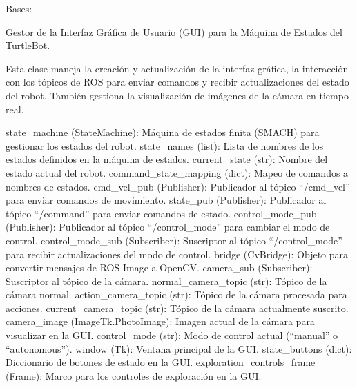 \documentclass[a4paper,10pt,spanish]{sphinxmanual}
\begin{document}

\begin{fulllineitems}
\label{\detokenize{squad_state_manager:squad_state_manager.InterfazManager}}
\pysigstartsignatures
{}
\pysigstopsignatures
\sphinxAtStartPar
Bases: 

\sphinxAtStartPar
Gestor de la Interfaz Gráfica de Usuario (GUI) para la Máquina de Estados del TurtleBot.

\sphinxAtStartPar
Esta clase maneja la creación y actualización de la interfaz gráfica, la interacción con
los tópicos de ROS para enviar comandos y recibir actualizaciones del estado del robot.
También gestiona la visualización de imágenes de la cámara en tiempo real.
\begin{description}
\sphinxAtStartPar
state\_machine (StateMachine): Máquina de estados finita (SMACH) para gestionar los estados del robot.
state\_names (list): Lista de nombres de los estados definidos en la máquina de estados.
current\_state (str): Nombre del estado actual del robot.
command\_state\_mapping (dict): Mapeo de comandos a nombres de estados.
cmd\_vel\_pub (Publisher): Publicador al tópico “/cmd\_vel” para enviar comandos de movimiento.
state\_pub (Publisher): Publicador al tópico “/command” para enviar comandos de estado.
control\_mode\_pub (Publisher): Publicador al tópico “/control\_mode” para cambiar el modo de control.
control\_mode\_sub (Subscriber): Suscriptor al tópico “/control\_mode” para recibir actualizaciones del modo de control.
bridge (CvBridge): Objeto para convertir mensajes de ROS Image a OpenCV.
camera\_sub (Subscriber): Suscriptor al tópico de la cámara.
normal\_camera\_topic (str): Tópico de la cámara normal.
action\_camera\_topic (str): Tópico de la cámara procesada para acciones.
current\_camera\_topic (str): Tópico de la cámara actualmente suscrito.
camera\_image (ImageTk.PhotoImage): Imagen actual de la cámara para visualizar en la GUI.
control\_mode (str): Modo de control actual (“manual” o “autonomous”).
window (Tk): Ventana principal de la GUI.
state\_buttons (dict): Diccionario de botones de estado en la GUI.
exploration\_controls\_frame (Frame): Marco para los controles de exploración en la GUI.


\end{description}
\end{fulllineitems}
\end{document}
